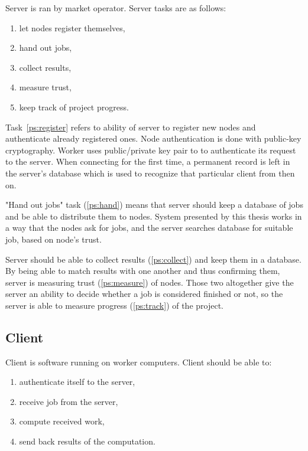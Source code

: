 Server is ran by market operator. Server tasks are as follows:
\begin{enumerate}
	\item \label{ps:register} let nodes register themselves,
	\item \label{ps:hand} hand out jobs,
	\item \label{ps:collect} collect results,
	\item \label{ps:measure} measure trust,
	\item \label{ps:track} keep track of project progress.
\end{enumerate}

Task~\ref{ps:register} refers to ability of server to register new nodes and authenticate already registered ones. Node authentication is done with public-key cryptography. Worker uses public/private key pair to to authenticate its request to the server. When connecting for the first time, a permanent record is left in the server's database which is used to recognize that particular client from then on.

"Hand out jobs" task (\ref{ps:hand}) means that server should keep a database of jobs and be able to distribute them to nodes. System presented by this thesis works in a way that the nodes ask for jobs, and the server searches database for suitable job, based on node's trust.

Server should be able to collect results (\ref{ps:collect}) and keep them in a database. By being able to match results with one another and thus confirming them, server is measuring trust (\ref{ps:measure}) of nodes. Those two altogether give the server an ability to decide whether a job is considered finished or not, so the server is able to measure progress (\ref{ps:track}) of the project.

\subsection{Client}

Client is software running on worker computers. Client should be able to:
\begin{enumerate}
	\item \label{cs:auth} authenticate itself to the server,
	\item \label{cs:recv} receive job from the server,
	\item \label{cs:compute} compute received work,
	\item \label{cs:send} send back results of the computation.
\end{enumerate}

